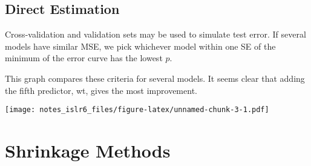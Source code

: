 \documentclass[
]{article}
\newenvironment{Shaded}{\begin{snugshade}}{\end{snugshade}}
\newcommand{\DataTypeTok}[1]{\textcolor[rgb]{0.13,0.29,0.53}{#1}}
\newcommand{\KeywordTok}[1]{\textcolor[rgb]{0.13,0.29,0.53}{\textbf{#1}}}
\newcommand{\NormalTok}[1]{#1}
\newcommand{\OperatorTok}[1]{\textcolor[rgb]{0.81,0.36,0.00}{\textbf{#1}}}
\newcommand{\StringTok}[1]{\textcolor[rgb]{0.31,0.60,0.02}{#1}}
\begin{document}
\hypertarget{direct-estimation}{%
\subsection{Direct Estimation}\label{direct-estimation}}

Cross-validation and validation sets may be used to simulate test error.
If several models have similar MSE, we pick whichever model within one
SE of the minimum of the error curve has the lowest \(p\).

This graph compares these criteria for several models. It seems clear
that adding the fifth predictor, wt, gives the most improvement.

\begin{Shaded}
\end{Shaded}

\texttt{[image: notes\_islr6\_files/figure-latex/unnamed-chunk-3-1.pdf]}

\hypertarget{shrinkage-methods}{%
\section{Shrinkage Methods}\label{shrinkage-methods}}
\end{document}
